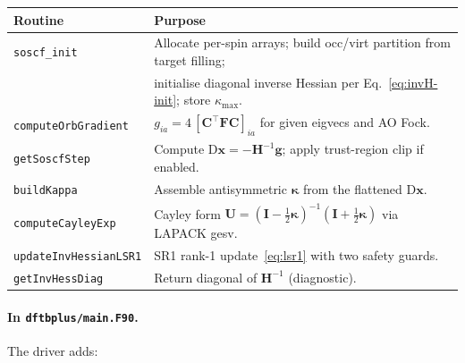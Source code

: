 \documentclass[11pt,a4paper]{article}
\newcommand{\kkappa}{\bm{\kappa}}
\newcommand{\xx}{\mathbf{x}}
\newcommand{\gg}{\mathbf{g}}
\newcommand{\HH}{\mathbf{H}}
\newcommand{\FF}{\mathbf{F}}
\newcommand{\CC}{\mathbf{C}}
\newcommand{\UU}{\mathbf{U}}
\newcommand{\II}{\mathbf{I}}
\begin{document}
\begin{center}
\begin{tabular}{ll}
\toprule
Routine & Purpose \\
\midrule
\texttt{soscf\_init} & Allocate per-spin arrays; build occ/virt partition from target filling; \\
& initialise diagonal inverse Hessian per Eq.~\eqref{eq:invH-init}; store $\kappa_\mathrm{max}$. \\
\texttt{computeOrbGradient} & $g_{ia} = 4\,[\CC^\top \FF\CC]_{ia}$ for given eigvecs and AO Fock. \\
\texttt{getSoscfStep} & Compute $\mathrm{D}\xx=-\HH^{-1}\gg$; apply trust-region clip if enabled. \\
\texttt{buildKappa} & Assemble antisymmetric $\kkappa$ from the flattened $\mathrm{D}\xx$. \\
\texttt{computeCayleyExp} & Cayley form $\UU=(\II-\tfrac12\kkappa)^{-1}(\II+\tfrac12\kkappa)$ via LAPACK gesv. \\
\texttt{updateInvHessianLSR1} & SR1 rank-1 update~\eqref{eq:lsr1} with two safety guards. \\
\texttt{getInvHessDiag} & Return diagonal of $\HH^{-1}$ (diagnostic). \\
\bottomrule
\end{tabular}
\end{center}

\paragraph{In \texttt{dftbplus/main.F90}.}
The driver adds:
\end{document}
